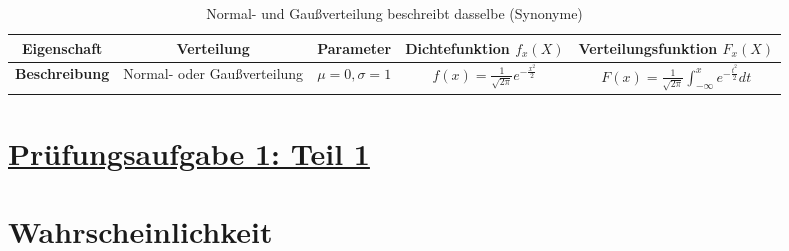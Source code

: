 \documentclass[12pt]{article}
\begin{document}
         \begin{table}[h!]
            \centering
            \footnotesize
            \renewcommand{\arraystretch}{2} 
            \setlength{\tabcolsep}{9pt} 
            \begin{tabular}{|c|c|c|c|c|}  %
            \hline   %
            \textbf{Eigenschaft} & Verteilung & Parameter & Dichtefunktion \(f_x(X)\) & Verteilungsfunktion \(F_x(X)\) \\ \hline  %
            \textbf{Beschreibung} & Normal- oder Gaußverteilung & \(\mu = 0, \sigma = 1\) & 
            \(\displaystyle f(x) = \frac{1}{\sqrt{2\pi}} e^{-\frac{x^2}{2}}\) & 
            \(\displaystyle F(x) = \frac{1}{\sqrt{2\pi}} \int_{-\infty}^x e^{-\frac{t^2}{2}} dt\) \\ \hline %
            \end{tabular}
            \caption*{\footnotesize Normal- und Gaußverteilung beschreibt dasselbe (Synonyme)}
         \end{table}

\newpage

\section*{\underline{Prüfungsaufgabe 1: Teil 1}}

\pagecolor{Aufgabe1Teil1}

   \section*{Wahrscheinlichkeit}
\end{document}
